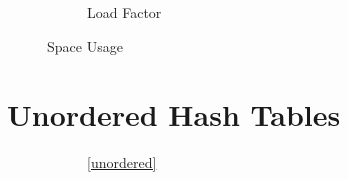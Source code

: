 \documentclass[11pt,a4paper]{article}
\begin{document}
\begin{figure}[H]
    \begin{subfigure}{\linewidth}
        \centering
        
        \caption{Load Factor}
    \end{subfigure}
    \caption{Space Usage}
\end{figure}

\section{Unordered Hash Tables}


\begin{figure}[H]
\begin{subfigure}{\linewidth}
\centering
    \ref{unordered}
\end{subfigure}


\end{figure}
\end{document}
